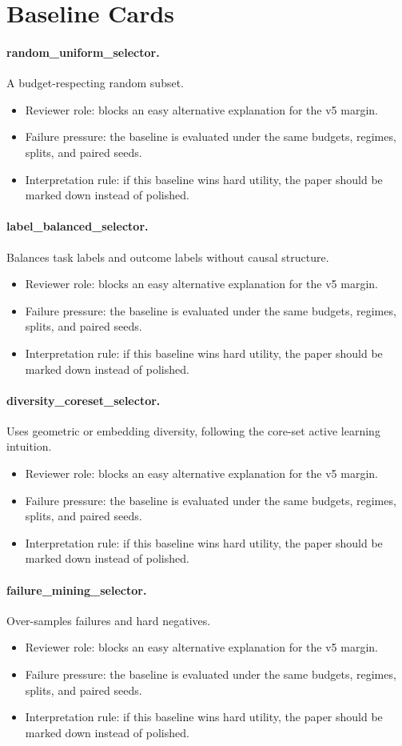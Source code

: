 \documentclass{article}
\begin{document}
\section{Baseline Cards}
\paragraph{random\_uniform\_selector.} A budget-respecting random subset.
\begin{itemize}
\item Reviewer role: blocks an easy alternative explanation for the v5 margin.
\item Failure pressure: the baseline is evaluated under the same budgets, regimes, splits, and paired seeds.
\item Interpretation rule: if this baseline wins hard utility, the paper should be marked down instead of polished.
\end{itemize}
\paragraph{label\_balanced\_selector.} Balances task labels and outcome labels without causal structure.
\begin{itemize}
\item Reviewer role: blocks an easy alternative explanation for the v5 margin.
\item Failure pressure: the baseline is evaluated under the same budgets, regimes, splits, and paired seeds.
\item Interpretation rule: if this baseline wins hard utility, the paper should be marked down instead of polished.
\end{itemize}
\paragraph{diversity\_coreset\_selector.} Uses geometric or embedding diversity, following the core-set active learning intuition.
\begin{itemize}
\item Reviewer role: blocks an easy alternative explanation for the v5 margin.
\item Failure pressure: the baseline is evaluated under the same budgets, regimes, splits, and paired seeds.
\item Interpretation rule: if this baseline wins hard utility, the paper should be marked down instead of polished.
\end{itemize}
\paragraph{failure\_mining\_selector.} Over-samples failures and hard negatives.
\begin{itemize}
\item Reviewer role: blocks an easy alternative explanation for the v5 margin.
\item Failure pressure: the baseline is evaluated under the same budgets, regimes, splits, and paired seeds.
\item Interpretation rule: if this baseline wins hard utility, the paper should be marked down instead of polished.
\end{itemize}
\end{document}
